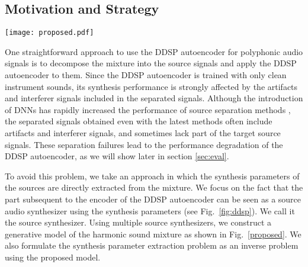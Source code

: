 \documentclass{article}
\begin{document}
\subsection{Motivation and Strategy}\label{sec:motivation}
\begin{figure*}[t]
\centering 
\texttt{[image: proposed.pdf]}
\caption{DDSP mixture model with $R$ sources.}
\vspace{-9pt}
\label{proposed}
\end{figure*}
One straightforward approach to use the DDSP autoencoder for polyphonic audio signals is to decompose the mixture into the source signals and apply the DDSP autoencoder to them.
Since the DDSP autoencoder is trained with only clean instrument sounds, its synthesis performance is strongly affected by the artifacts and interferer signals included in the separated signals.
Although the introduction of DNNs has rapidly increased the performance of source separation methods \cite{bunrireport}, the separated signals obtained even with the latest methods often include artifacts and interferer signals, and sometimes lack part of the target source signals.
These separation failures lead to the performance degradation of the DDSP autoencoder, as we will show later in section \ref{sec:eval}.

To avoid this problem, we take an approach in which the synthesis parameters of the sources are directly extracted from the mixture.
We focus on the fact that the part subsequent to the encoder of the DDSP autoencoder can be seen as a source audio synthesizer using the synthesis parameters (see Fig.~\ref{fig:ddsp}). We call it the source synthesizer. Using multiple source synthesizers, we construct a generative model of the harmonic sound mixture as shown in Fig.~\ref{proposed}. We also formulate the synthesis parameter extraction problem as an inverse problem using the proposed model.
\end{document}
